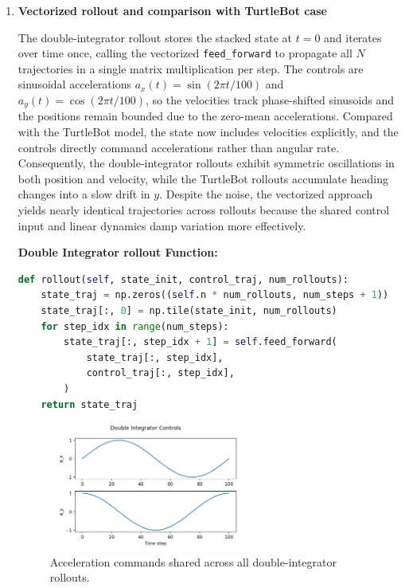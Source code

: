 \documentclass [11pt]{article}
\begin{document}
\begin{enumerate}[label=(\roman*)]
        \item \textbf{Vectorized rollout and comparison with TurtleBot case}

        The double-integrator rollout stores the stacked state at $t=0$ and iterates over time once, calling the vectorized \texttt{feed\_forward} to propagate all $N$ trajectories in a single matrix multiplication per step. The controls are sinusoidal accelerations $a_x(t) = \sin(2\pi t/100)$ and $a_y(t) = \cos(2\pi t/100)$, so the velocities track phase-shifted sinusoids and the positions remain bounded due to the zero-mean accelerations. Compared with the TurtleBot model, the state now includes velocities explicitly, and the controls directly command accelerations rather than angular rate. Consequently, the double-integrator rollouts exhibit symmetric oscillations in both position and velocity, while the TurtleBot rollouts accumulate heading changes into a slow drift in $y$. Despite the noise, the vectorized approach yields nearly identical trajectories across rollouts because the shared control input and linear dynamics damp variation more effectively.

        \textbf{Double Integrator rollout Function:}
\begin{lstlisting}[language=Python]
def rollout(self, state_init, control_traj, num_rollouts):
    state_traj = np.zeros((self.n * num_rollouts, num_steps + 1))
    state_traj[:, 0] = np.tile(state_init, num_rollouts)
    for step_idx in range(num_steps):
        state_traj[:, step_idx + 1] = self.feed_forward(
            state_traj[:, step_idx],
            control_traj[:, step_idx],
        )
    return state_traj
\end{lstlisting}

        \begin{figure}[H]
            \centering
            \includegraphics[width=0.6\textwidth]{figs/p2_double_integrator_controls.png}
            \caption{Acceleration commands shared across all double-integrator rollouts.}
            \label{fig:p2_di_ctrl}
        \end{figure}


\end{enumerate}
\end{document}
